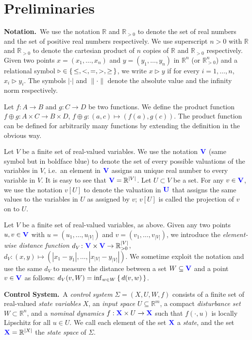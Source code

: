 
\section{Preliminaries}

\smallskip
\noindent\textbf{Notation.}\
We use the notation $\mathbb{R}$ and $\mathbb{R}_{>0}$ to denote the set of real numbers and the set of positive real numbers respectively.
We use superscript $n>0$ with $\mathbb{R}$ and $\mathbb{R}_{>0}$ to denote the cartesian product of $n$ copies of $\mathbb{R}$ and $\mathbb{R}_{>0}$ respectively.
Given two points $x=(x_1,\ldots, x_n)$ and $y=(y_1,\ldots, y_n)$ in $ \mathbb{R}^n$ (or $\mathbb{R}^n_{>0}$) and a relational symbol $\triangleright\in \set{\leq, <, = , >, \geq}$, we write $x\triangleright y$ if for every $i=1,\ldots,n$, $x_i\triangleright y_i$.
The symbols $|\cdot |$ and $\| \cdot \|$ denote the absolute value and the infinity norm respectively.  

Let $f\colon A\to B$ and $g\colon C\to D$ be two functions.
We define the product function $f\oplus g\colon A\times C\to B\times D $, $f\oplus g \colon (a,c)\mapsto (f(a),g(c))$.
The product function can be defined for arbitrarily many functions by extending the definition in the obvious way.

Let $V$ be a finite set of real-valued variables.
We use the notation ${\color{blue} \mathbf{V}}$ (same symbol but in boldface blue) to denote the set of every possible valuations of the variables in $V$, i.e.\ an element in ${\color{blue} \mathbf{V}}$ assigns an unique real number to every variable in $V$.
It is easy to see that ${\color{blue} \mathbf{V}} = \mathbb{R}^{|V|}$.
Let $U\subset V$ be a set.
For any $v\in {\color{blue} \mathbf{V}}$, we use the notation $v[U]$ to denote the valuation in ${\color{blue} \mathbf{U}}$ that assigns the same values to the variables in $U$ as assigned by $v$; $v[U]$ is called the projection of $v$ on to $U$.

Let $V$ be a finite set of real-valued variables, as above.
Given any two points $u,v\in {\color{blue} \mathbf{V}}$ with $u=(u_1,\ldots,u_{|V|})$ and $v=(v_1,\ldots,v_{|V|})$, we introduce the \emph{element-wise distance function} $d_V\colon {\color{blue} \mathbf{V}}\times {\color{blue} \mathbf{V}}\to \mathbb{R}^{|V|}_{>0} $, $d_V\colon (x,y) \mapsto (|x_1-y_1|,\ldots, |x_{|V|}-y_{|V|}|)$.
We sometime exploit the notation and use the same $d_V$ to measure the distance between a set $W\subseteq {\color{blue} \mathbf{V}}$ and a point $v\in {\color{blue} \mathbf{V}}$ as follows:
$d_V(v,W)= \inf_{w\in W}\set{d(v,w)}$.
 
\smallskip
\noindent\textbf{Control System.}\
A \emph{control system} $\Sigma = (X, U, W, f)$
consists of a finite set of real-valued \emph{state variables} $X$,
 an \emph{input space} $U\subseteq\mathbb{R}^m$, 
a compact \emph{disturbance set} $W\subset \mathbb{R}^n$, and 
a \emph{nominal dynamics} $f:{\color{blue} \mathbf{X}}\times U\rightarrow {\color{blue} \mathbf{X}}$ such that $f(\cdot,u)$ is locally Lipschitz for all $u\in U$. 
%
We call each element of the set ${\color{blue} \mathbf{X}}$ a \emph{state}, and the set ${\color{blue} \mathbf{X}} = \mathbb{R}^{|X|}$ the \emph{state space} of $\Sigma$.

